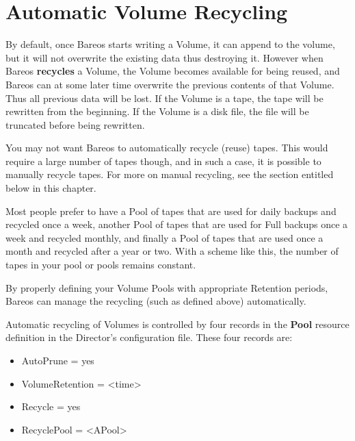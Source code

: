 
\section{Automatic Volume Recycling}
\label{RecyclingChapter}

By default, once Bareos starts writing a Volume, it can append to the
volume, but it will not overwrite the existing data thus destroying it.
However when Bareos {\bf recycles} a Volume, the Volume becomes available
for being reused, and Bareos can at some later time overwrite the previous
contents of that Volume.  Thus all previous data will be lost.  If the
Volume is a tape, the tape will be rewritten from the beginning.  If the
Volume is a disk file, the file will be truncated before being rewritten.

You may not want Bareos to automatically recycle (reuse) tapes.  This would
require a large number of tapes though, and in such a case, it is possible
to manually recycle tapes.  For more on manual recycling, see the section
entitled  below in this
chapter.

Most people prefer to have a Pool of tapes that are used for daily backups and
recycled once a week, another Pool of tapes that are used for Full backups
once a week and recycled monthly, and finally a Pool of tapes that are used
once a month and recycled after a year or two. With a scheme like this, the
number of tapes in your pool or pools remains constant.

By properly defining your Volume Pools with appropriate Retention periods,
Bareos can manage the recycling (such as defined above) automatically.

Automatic recycling of Volumes is controlled by four records in the {\bf
Pool} resource definition in the Director's configuration file. These four
records are:

\begin{itemize}
\item AutoPrune = yes
\item VolumeRetention = {\textless}time{\textgreater}
\item Recycle = yes
\item RecyclePool = {\textless}APool{\textgreater} %
\end{itemize}

